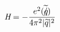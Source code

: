 \begin{equation}
\textit{H}=-\frac{e^{2}(\widetilde{q\hspace{-0.2cm}/})}{4\pi^{2}|\widetilde{q}|^{2}}
\end{equation}\
